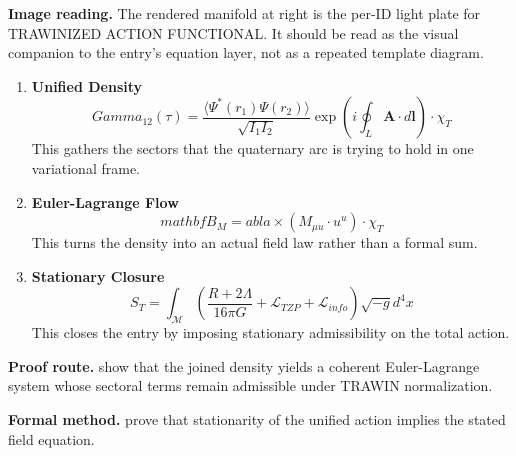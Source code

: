 \begin{samepage}
\noindent\begin{minipage}[t]{0.45\linewidth}
\vspace{0pt}
\raggedright
\scriptsize\textbf{Image reading.} The rendered manifold at right is the per-ID light plate for TRAWINIZED ACTION FUNCTIONAL. It should be read as the visual companion to the entry's equation layer, not as a repeated template diagram.\par
\end{minipage}\hfill
\begin{minipage}[t]{0.53\linewidth}
\vspace*{-0.10in}
\raggedright
{}
\end{minipage}
\end{samepage}

\clearpage


\begin{enumerate}[leftmargin=1.6em,itemsep=9pt,topsep=6pt]
\item \textbf{Unified Density}
\[
Gamma_{12}(\tau) = \frac{\langle \Psi^*(r_1)\Psi(r_2) \rangle}{\sqrt{I_1 I_2}} \exp\left( i \oint_L \mathbf{A} \cdot d\mathbf{l} \right) \cdot \chi_T
\]
This gathers the sectors that the quaternary arc is trying to hold in one variational frame.

\item \textbf{Euler-Lagrange Flow}
\[
mathbf{B}_M =  abla \times (M_{\mu u} \cdot u^ u) \cdot \chi_T
\]
This turns the density into an actual field law rather than a formal sum.

\item \textbf{Stationary Closure}
\[
S_T = \int_{\mathcal{M}} \left( \frac{R + 2\Lambda}{16\pi G} + \mathcal{L}_{TZP} + \mathcal{L}_{info} \right) \sqrt{-g} d^4x
\]
This closes the entry by imposing stationary admissibility on the total action.
\end{enumerate}

\textbf{Proof route.} show that the joined density yields a coherent Euler-Lagrange system whose sectoral terms remain admissible under TRAWIN normalization.

\textbf{Formal method.} prove that stationarity of the unified action implies the stated field equation.

\medskip
{}

